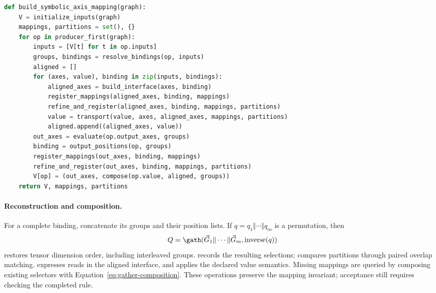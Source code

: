 \begin{paperalgorithm}[H]
\caption{Build interfaces, value expressions, and axis mappings.}
\label{alg:mapping}
\begin{lstlisting}[language=Python]
def build_symbolic_axis_mapping(graph):
    V = initialize_inputs(graph)
    mappings, partitions = set(), {}
    for op in producer_first(graph):
        inputs = [V[t] for t in op.inputs]
        groups, bindings = resolve_bindings(op, inputs)
        aligned = []
        for (axes, value), binding in zip(inputs, bindings):
            aligned_axes = build_interface(axes, binding)
            register_mappings(aligned_axes, binding, mappings)
            refine_and_register(aligned_axes, binding, mappings, partitions)
            value = transport(value, axes, aligned_axes, mappings, partitions)
            aligned.append((aligned_axes, value))
        out_axes = evaluate(op.output_axes, groups)
        binding = output_positions(op, groups)
        register_mappings(out_axes, binding, mappings)
        refine_and_register(out_axes, binding, mappings, partitions)
        V[op] = (out_axes, compose(op.value, aligned, groups))
    return V, mappings, partitions
\end{lstlisting}
\end{paperalgorithm}

\paragraph{Reconstruction and composition.}
For a complete binding, concatenate its groups and their position lists.
If $q=q_1\Vert\cdots\Vert q_m$ is a permutation, then
\begin{equation}
 Q=\gath(\vec G_1\Vert\cdots\Vert\vec G_m,\operatorname{inverse}(q))
 \label{extended:eq:rebuilt-interfaces}
\end{equation}
restores tensor dimension order, including interleaved groups.
 records the resulting selections;
 compares partitions through paired overlap
matching.  expresses reads in the aligned interface, and
 applies the declared value semantics. Missing mappings are
queried by composing existing selectors with
Equation~\eqref{eq:gather-composition}. These operations preserve the
mapping invariant; acceptance still requires checking the completed rule.

